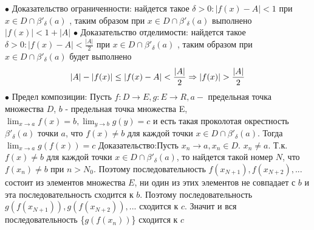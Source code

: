 \documentclass[12pt]{article}
\theoremstyle{definition}
\begin{document}
$\bullet$ Доказательство ограниченности: найдется такое  $\delta > 0: |f(x) - A| < 1$ при $x \in D \cap \beta'_{\delta}(a)$ , таким образом при $x \in D \cap \beta'_{\delta}(a)$ выполнено $|f(x) | < 1 + |A|$\newline
$\bullet$ Доказательство отделимости: найдется такое  $\delta > 0: |f(x) - A| < \frac{|A|}{2}$ при $x \in D \cap \beta'_{\delta}(a)$ , таким образом при $x \in D \cap \beta'_{\delta}(a)$ будет выполнено 
$$
|A| - |f(x)| \leq |f(x) - A| < \frac{|A|}{2} \Rightarrow \\ |f(x)| > \frac{|A|}{2}
$$\newline
$\bullet$ Предел композиции:\newline
Пусть $f: D \xrightarrow{} E, g: E \xrightarrow{} R, a - $ предельная точка множества $D$, $b$ - предельная точка множества E, $\lim_{x \to a} f(x) = b, \lim_{y \to b} g(y) = c$ и есть такая проколотая окрестность $\beta'_{\delta}(a)$ точки $a$, что $f(x) \not = b $ для каждой точки $x \in D \cap \beta'_{\delta}(a)$. Тогда $\lim_{x \to a} g(f(x)) = c$\newline
Доказательство:\newline Пусть $x_n \xrightarrow{} a, x_n \in D$. $ x_n \not = a.$ Т.к. $f(x) \not = b$ для каждой точки $x \in D \cap \beta'_{\delta}(a)$, то найдется такой номер $N$, что $f(x_n) \not = b$ при $n > N_0$. Поэтому последовательность $f(x_{N+1}), f(x_{N+2}), ...$ состоит из элементов множества $E$, ни один из этих элементов не совпадает с $b$ и эта последовательность сходится к $b$. Поэтому последовательность $g(f(x_{N+1})), g(f(x_{N+2})), ... $ сходится к $c$. Значит и вся последовательность \{$g(f(x_n))$\} сходится к $c$  \newline
\end{document}

